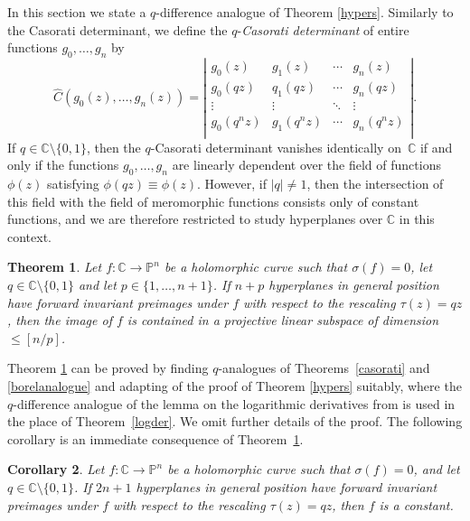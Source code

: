 \documentclass{amsart}
\newcommand{\C}{\mathbb{C}}
\renewcommand{\P}{\mathbb{P}}
\newtheorem{theorem}{Theorem}%
\newtheorem{corollary}[theorem]{Corollary}
\theoremstyle{definition}
\numberwithin{equation}{section}
\numberwithin{theorem}{section}
\begin{document}
In this section we state a $q$-difference analogue of Theorem
\ref{hypers}. Similarly to the Casorati determinant, we define the
$q$-\textit{Casorati determinant} of entire functions
$g_0,\ldots,g_n$ by
    \begin{equation*}
    \hat{C}(g_0(z),\ldots,g_n(z))=\left|\begin{array}{ccccc}
      g_0(z) & g_1(z) & \cdots & g_n(z) \\
      g_0(qz) & q_1(qz) & \cdots & g_n(qz) \\
      \vdots & \vdots & \ddots & \vdots \\
      g_0(q^{n}z) & g_1(q^{n}z) &  \cdots & g_n(q^{n}z) \\
    \end{array}\right|.
    \end{equation*}
If $q\in\C\setminus\{0,1\}$, then the $q$-Casorati determinant vanishes identically on~$\C$
if and only if the functions $g_0,\ldots,g_n$ are linearly
dependent over the field of functions $\phi(z)$ satisfying
$\phi(qz)\equiv \phi(z)$. However, if $|q|\not=1$, then the intersection
of this field with the field of meromorphic functions
consists only of constant functions, and we are therefore
restricted to study hyperplanes over $\C$ in this context.


\begin{theorem}\label{hypersq}
Let $f:\C\to\P^n$ be a holomorphic curve such that
$\sigma(f)=0$, let $q\in\C\setminus\{0,1\}$ and let $p\in\{1,\ldots,n+1\}$. If $n+p$ hyperplanes in general position have forward invariant preimages
under $f$ with respect to the rescaling $\tau(z)= qz$, then the image of $f$ is contained in a projective linear subspace of dimension $\leq[n/p]$.
\end{theorem}

Theorem \ref{hypersq} can be proved by finding $q$-analogues of Theorems~\ref{casorati} and \ref{borelanalogue} and adapting of the proof of Theorem \ref{hypers} suitably, where the
$q$-difference analogue of the lemma on the logarithmic
derivatives from \cite{barnetthkm:07} is used in the place of Theorem~\ref{logder}. We omit further details of
the proof. The following corollary is an immediate consequence of Theorem~\ref{hypersq}.

\begin{corollary}\label{hypersqcor}
Let $f:\C\to\P^n$ be a holomorphic curve such that
$\sigma(f)=0$, and let $q\in\C\setminus\{0,1\}$. If $2n+1$
hyperplanes in general position have forward invariant preimages
under $f$ with respect to the
rescaling $\tau(z)= qz$, then $f$ is a constant.
\end{corollary}
\end{document}

